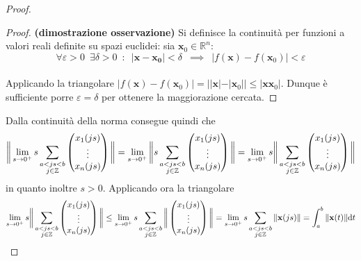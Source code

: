 \documentclass[10pt]{article}
\theoremstyle{plain}
\begin{document}
\begin{proof}
\begin{oss}
\end{oss}
\begin{proof}
\textbf{(dimostrazione osservazione)} Si definisce la continuità per funzioni a valori reali definite su spazi euclidei: sia $\mathbf{x}_0 \in \mathbb{R}^n$:  
\[\forall \varepsilon > 0 \enspace \exists \delta > 0 \enspace : \enspace |\mathbf{x} - \mathbf{x_0}| < \delta \enspace \implies \enspace |f(\mathbf{x}) - f(\mathbf{x}_0)| < \varepsilon\]
\\Applicando la triangolare $\displaystyle |f(\mathbf{x}) - f(\mathbf{x}_0)| = | |\mathbf{x}| - |\mathbf{x}_0| | \leq |\mathbf{x}\mathbf{x}_0|$. Dunque è sufficiente porre $\varepsilon = \delta$ per ottenere la maggiorazione cercata.
\end{proof}
Dalla continuità della norma consegue quindi che
\[\bigg{\|}\lim\limits_{s \rightarrow 0^+}s \sum_{\displaystyle \substack{a < js < b \\ j \in \mathbb{Z}}} \begin{pmatrix}
x_1(js)\\
\vdots\\
x_n(js)
\end{pmatrix}\bigg{\|} = \lim\limits_{s \rightarrow 0^+} \bigg{\|} s \sum_{\displaystyle \substack{a < js < b \\ j \in \mathbb{Z}}} \begin{pmatrix}
x_1(js)\\
\vdots\\
x_n(js)
\end{pmatrix}\bigg{\|} =  \lim\limits_{s \rightarrow 0^+} s \bigg{\|} \sum_{\displaystyle \substack{a < js < b \\ j \in \mathbb{Z}}} \begin{pmatrix}
x_1(js)\\
\vdots\\
x_n(js)
\end{pmatrix}\bigg{\|}\]
in quanto inoltre $s > 0$. Applicando ora la triangolare 
\[\lim\limits_{s \rightarrow 0^+} s \bigg{\|} \sum_{\displaystyle \substack{a < js < b \\ j \in \mathbb{Z}}} \begin{pmatrix}
x_1(js)\\
\vdots\\
x_n(js)
\end{pmatrix}\bigg{\|} \leq \lim\limits_{s \rightarrow 0^+} s \sum_{\displaystyle \substack{a < js < b \\ j \in \mathbb{Z}}} \bigg{\|}  \begin{pmatrix}
x_1(js)\\
\vdots\\
x_n(js)
\end{pmatrix}\bigg{\|} = \lim\limits_{s \rightarrow 0^+} s \sum_{\displaystyle \substack{a < js < b \\ j \in \mathbb{Z}}} \|\mathbf{x}(js)\| = \int_{a}^{b}\|\mathbf{x}(t)\|\textrm{d}t\]
\end{proof}
\end{document}
